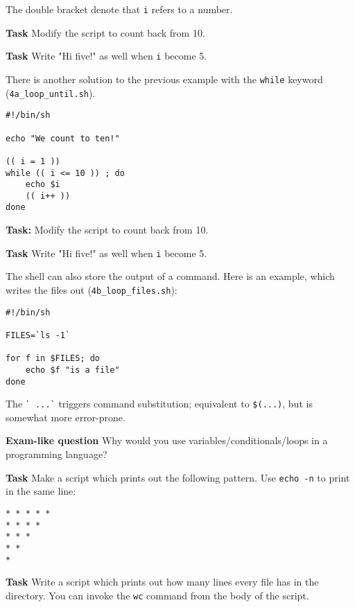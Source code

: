 \documentclass{article}\usepackage[]{graphicx}\usepackage[usenames,dvipsnames]{color}
\begin{document}
The double bracket denote that \verb+i+ refers to a number.

\textbf{Task} Modify the script to count back from 10.

\textbf{Task} Write "Hi five!" as well when \verb+i+ become 5.

There is another solution to the previous example with the \verb+while+ keyword (\verb+4a_loop_until.sh+).

\begin{verbatim}
#!/bin/sh

echo "We count to ten!"

(( i = 1 ))
while (( i <= 10 )) ; do
    echo $i
    (( i++ ))
done
\end{verbatim}

\textbf{Task:} Modify the script to count back from 10.

\textbf{Task} Write "Hi five!" as well when \verb+i+ become 5.

The shell can also store the output of a command. Here is an example, which writes the files out (\verb+4b_loop_files.sh+):

\begin{verbatim}
#!/bin/sh

FILES=`ls -1`

for f in $FILES; do
    echo $f "is a file"
done
\end{verbatim}

The \verb+` ...`+ triggers command substitution; equivalent to \verb+$(...)+, but is somewhat more error-prone.

\textbf{Exam-like question} Why would you use variables/conditionals/loops in a programming language?

\textbf{Task} Make a script which prints out the following pattern. Use \verb+echo -n+ to print in the same line:
\begin{verbatim}
* * * * *
* * * *
* * *
* * 
*
\end{verbatim}

\textbf{Task} Write a script which prints out how many lines every file has in the directory. You can invoke the \verb+wc+ command from the body of the script.
\end{document}

